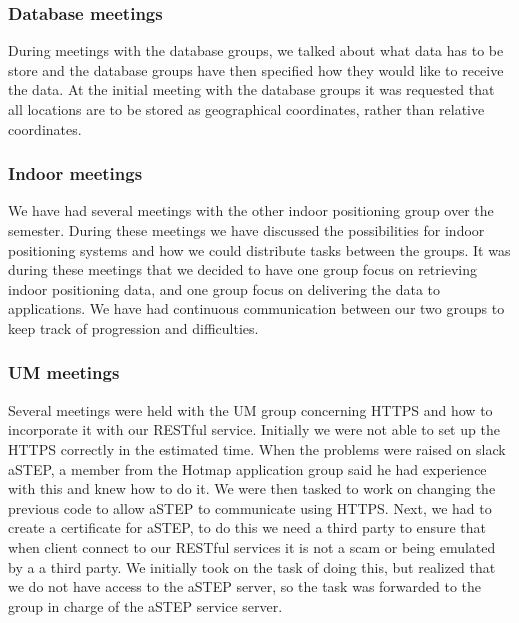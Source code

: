 \subsubsection*{Database meetings}
During meetings with the database groups, we talked about what data has to be store and the database groups have then specified how they would like to receive the data. At the initial meeting with the database groups it was requested that all locations are to be stored as geographical coordinates, rather than relative coordinates.

\subsubsection*{Indoor meetings}
We have had several meetings with the other indoor positioning group over the semester. During these meetings we have discussed the possibilities for indoor positioning systems and how we could distribute tasks between the groups. It was during these meetings that we decided to have one group focus on retrieving indoor positioning data, and one group focus on delivering the data to applications. We have had continuous communication between our two groups to keep track of progression and difficulties.

\subsubsection*{UM meetings}
Several meetings were held with the UM group concerning HTTPS and how to incorporate it with our RESTful service. Initially we were not able to set up the HTTPS correctly in the estimated time. When the problems were raised on slack aSTEP, a member from the Hotmap application group said he had experience with this and knew how to do it. We were then tasked to work on changing the previous code to allow aSTEP to communicate using HTTPS. Next, we had to create a certificate for aSTEP, to do this we need a third party to ensure that when client connect to our RESTful services it is not a scam or being emulated by a a third party. We initially took on the task of doing this, but realized that we do not have access to the aSTEP server, so the task was forwarded to the group in charge of the aSTEP service server. 